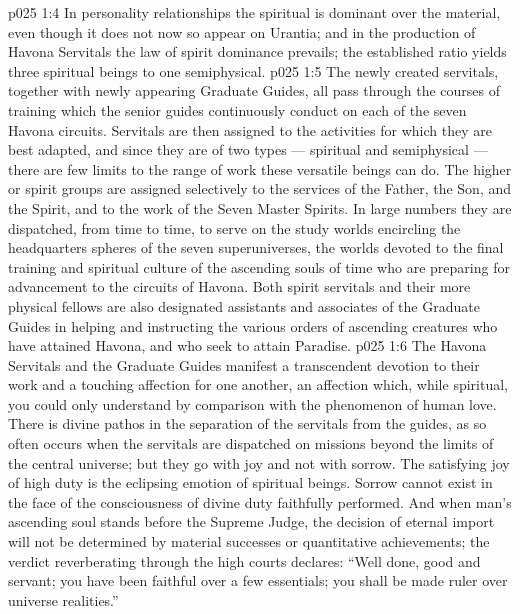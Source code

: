 \vs p025 1:4 \pc In personality relationships the spiritual is dominant over the material, even though it does not now so appear on Urantia; and in the production of Havona Servitals the law of spirit dominance prevails; the established ratio yields three spiritual beings to one semiphysical.
\vs p025 1:5 \pc The newly created servitals, together with newly appearing Graduate Guides, all pass through the courses of training which the senior guides continuously conduct on each of the seven Havona circuits. Servitals are then assigned to the activities for which they are best adapted, and since they are of two types --- spiritual and semiphysical --- there are few limits to the range of work these versatile beings can do. The higher or spirit groups are assigned selectively to the services of the Father, the Son, and the Spirit, and to the work of the Seven Master Spirits. In large numbers they are dispatched, from time to time, to serve on the study worlds encircling the headquarters spheres of the seven superuniverses, the worlds devoted to the final training and spiritual culture of the ascending souls of time who are preparing for advancement to the circuits of Havona. Both spirit servitals and their more physical fellows are also designated assistants and associates of the Graduate Guides in helping and instructing the various orders of ascending creatures who have attained Havona, and who seek to attain Paradise.
\vs p025 1:6 The Havona Servitals and the Graduate Guides manifest a transcendent devotion to their work and a touching affection for one another, an affection which, while spiritual, you could only understand by comparison with the phenomenon of human love. There is divine pathos in the separation of the servitals from the guides, as so often occurs when the servitals are dispatched on missions beyond the limits of the central universe; but they go with joy and not with sorrow. The satisfying joy of high duty is the eclipsing emotion of spiritual beings. Sorrow cannot exist in the face of the consciousness of divine duty faithfully performed. And when man’s ascending soul stands before the Supreme Judge, the decision of eternal import will not be determined by material successes or quantitative achievements; the verdict reverberating through the high courts declares: “Well done, good and  servant; you have been faithful over a few essentials; you shall be made ruler over universe realities.”
